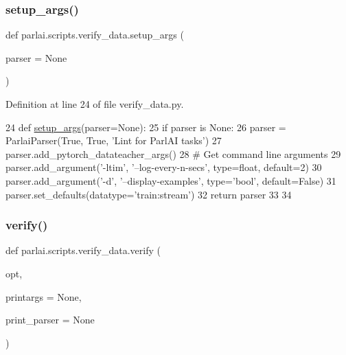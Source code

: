 \subsubsection{\texorpdfstring{setup\+\_\+args()}{setup\_args()}}
{\footnotesize\ttfamily def parlai.\+scripts.\+verify\+\_\+data.\+setup\+\_\+args (\begin{DoxyParamCaption}\item[{}]{parser = {\ttfamily None} }\end{DoxyParamCaption})}



Definition at line 24 of file verify\+\_\+data.\+py.


\begin{DoxyCode}
24 \textcolor{keyword}{def }\hyperlink{namespaceparlai_1_1scripts_1_1verify__data_aecfb15331606adc88ee4221c2945a17d}{setup\_args}(parser=None):
25     \textcolor{keywordflow}{if} parser \textcolor{keywordflow}{is} \textcolor{keywordtype}{None}:
26         parser = ParlaiParser(\textcolor{keyword}{True}, \textcolor{keyword}{True}, \textcolor{stringliteral}{'Lint for ParlAI tasks'})
27     parser.add\_pytorch\_datateacher\_args()
28     \textcolor{comment}{# Get command line arguments}
29     parser.add\_argument(\textcolor{stringliteral}{'-ltim'}, \textcolor{stringliteral}{'--log-every-n-secs'}, type=float, default=2)
30     parser.add\_argument(\textcolor{stringliteral}{'-d'}, \textcolor{stringliteral}{'--display-examples'}, type=\textcolor{stringliteral}{'bool'}, default=\textcolor{keyword}{False})
31     parser.set\_defaults(datatype=\textcolor{stringliteral}{'train:stream'})
32     \textcolor{keywordflow}{return} parser
33 
34 
\end{DoxyCode}
\mbox{\label{namespaceparlai_1_1scripts_1_1verify__data_acf6da63d62b2bf71c8fb7860e944a5bf}} 
\subsubsection{\texorpdfstring{verify()}{verify()}}
{\footnotesize\ttfamily def parlai.\+scripts.\+verify\+\_\+data.\+verify (\begin{DoxyParamCaption}\item[{}]{opt,  }\item[{}]{printargs = {\ttfamily None},  }\item[{}]{print\+\_\+parser = {\ttfamily None} }\end{DoxyParamCaption})}



